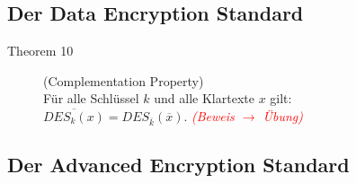 \documentclass[10pt,a4paper]{article}
\begin{document}
\subsection{Der Data Encryption Standard}
\begin{description}
	\item[Theorem 10] (Complementation Property)\\
Für alle Schlüssel $k$ und alle Klartexte $x$ gilt:\\
$\overline{DES_k (x)} = DES_{\overline{k}}(\overline{x})$.
\textit{\textcolor{red}{(Beweis $\to$ Übung)}}
\end{description}
\subsection{Der Advanced Encryption Standard}
\end{document}
